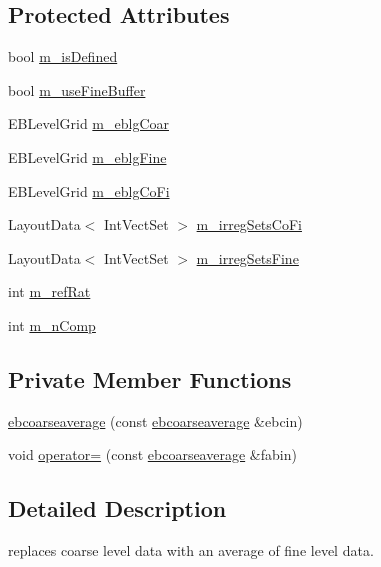 \subsection*{Protected Attributes}
\begin{DoxyCompactItemize}
\item 
bool \hyperlink{classebcoarseaverage_a80db48bc49eb02c6d7dd169e4bc7400d}{m\+\_\+is\+Defined}
\item 
bool \hyperlink{classebcoarseaverage_aeae7e54b795c68ca2f679cf60a3ea0ea}{m\+\_\+use\+Fine\+Buffer}
\item 
E\+B\+Level\+Grid \hyperlink{classebcoarseaverage_aec18fdc27c15bea5560da5cce4c42f87}{m\+\_\+eblg\+Coar}
\item 
E\+B\+Level\+Grid \hyperlink{classebcoarseaverage_af7e65f929aae040988853c33135a3300}{m\+\_\+eblg\+Fine}
\item 
E\+B\+Level\+Grid \hyperlink{classebcoarseaverage_a0ed63122d2561d5763ae10d02575bcf3}{m\+\_\+eblg\+Co\+Fi}
\item 
Layout\+Data$<$ Int\+Vect\+Set $>$ \hyperlink{classebcoarseaverage_a680dafd1a2f432720739a6c5ad9ddc2b}{m\+\_\+irreg\+Sets\+Co\+Fi}
\item 
Layout\+Data$<$ Int\+Vect\+Set $>$ \hyperlink{classebcoarseaverage_ae97f5983187a015c9cff6c8554ca1230}{m\+\_\+irreg\+Sets\+Fine}
\item 
int \hyperlink{classebcoarseaverage_a8c01e0a7b7cd67731ef4f98b008f50ca}{m\+\_\+ref\+Rat}
\item 
int \hyperlink{classebcoarseaverage_a628edd68230cc8bae2f17f677678b6db}{m\+\_\+n\+Comp}
\end{DoxyCompactItemize}
\subsection*{Private Member Functions}
\begin{DoxyCompactItemize}
\item 
\hyperlink{classebcoarseaverage_a48c02fbd1764a3c283f115b8ac563a63}{ebcoarseaverage} (const \hyperlink{classebcoarseaverage}{ebcoarseaverage} \&ebcin)
\item 
void \hyperlink{classebcoarseaverage_a3b1c5bc95d9407be7bf086ac88f4143d}{operator=} (const \hyperlink{classebcoarseaverage}{ebcoarseaverage} \&fabin)
\end{DoxyCompactItemize}


\subsection{Detailed Description}
replaces coarse level data with an average of fine level data. 

